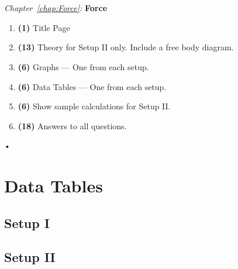 \documentclass[main.tex]{subfiles}
\begin{document}
\begin{samepage}
\hrulefill\\ \\
\emph{Chapter~\ref{chap:Force}:} \textbf{Force}
\begin{enumerate}
\item
\textbf{(1)} Title Page
\item
\textbf{(13)} Theory for Setup II only. Include a free body diagram.
\item
\textbf{(6)} Graphs --- One from each setup.
\item
\textbf{(6)} Data Tables --- One from each setup.
\item
\textbf{(6)} Show sample calculations for Setup II.
\item
\textbf{(18)} Answers to all questions.
\end{enumerate}•
\end{samepage}

\newpage
\section{Data Tables}

\subsection*{Setup I}
\begin{doublespace}
\end{doublespace}

\newpage
\subsection*{Setup II}
\end{document}
